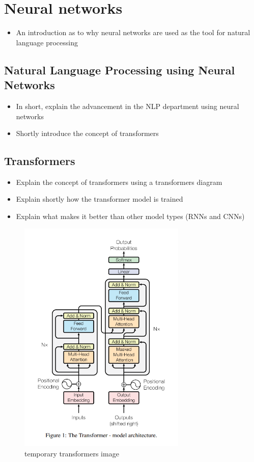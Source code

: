 


\chapter{Neural networks} \label{ch:intro}
\begin{itemize}
    \item An introduction as to why neural networks are used as the tool for natural language processing
\end{itemize}

\section{Natural Language Processing using Neural Networks} \label{sec:NLProcNN}

\begin{itemize}
    \item In short, explain the advancement in the NLP department using neural networks
    \item Shortly introduce the concept of transformers
\end{itemize}

\section{Transformers} \label{sec:TF}

\begin{itemize}
    \item Explain the concept of transformers using a transformers diagram
    \item Explain shortly how the transformer model is trained
    \item Explain what makes it better than other model types (RNNs and CNNs)
\end{itemize}

\begin{figure}[h]
    \centering
    \includegraphics[width=8cm]{img/Transformers_TEMP.png}
    \caption{temporary transformers image}
   
\end{figure}


